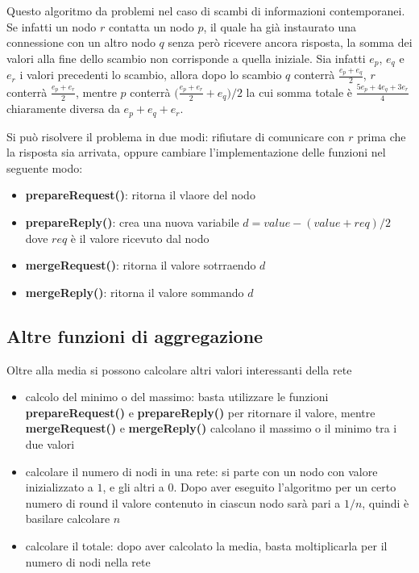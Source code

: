 Questo algoritmo da problemi nel caso di scambi di informazioni contemporanei. Se infatti un nodo $r$ contatta un nodo $p$, il quale ha già instaurato una connessione con un altro nodo $q$ senza però ricevere ancora risposta, la somma dei valori alla fine dello scambio non corrisponde a quella iniziale. Sia infatti $e_p$, $e_q$ e $e_r$ i valori precedenti lo scambio, allora dopo lo scambio $q$ conterrà $\frac{e_p+e_q}{2}$, $r$ conterrà $\frac{e_p + e_r}{2}$, mentre $p$ conterrà $\Big(\frac{e_p+e_r}{2} + e_q\Big) / 2$ la cui somma totale è $\frac{5e_p + 4 e_q + 3e_r}{4}$ chiaramente diversa da $e_p+e_q+e_r$.

Si può risolvere il problema in due modi: rifiutare di comunicare con $r$ prima che la risposta sia arrivata, oppure cambiare l'implementazione delle funzioni nel seguente modo:
\begin{itemize}
    \item \textbf{prepareRequest()}: ritorna il vlaore del nodo
    \item \textbf{prepareReply()}: crea una nuova variabile $d=value - (value + req)/2$ dove $req$ è il valore ricevuto dal nodo
    \item \textbf{mergeRequest()}: ritorna il valore sotrraendo $d$
    \item \textbf{mergeReply()}: ritorna il valore sommando $d$
\end{itemize}


\subsection{Altre funzioni di aggregazione}
Oltre alla media si possono calcolare altri valori interessanti della rete
\begin{itemize}
    \item calcolo del minimo o del massimo: basta utilizzare le funzioni \textbf{prepareRequest()} e \textbf{prepareReply()} per ritornare il valore, mentre \textbf{mergeRequest()} e \textbf{mergeReply()} calcolano il massimo o il minimo tra i due valori
    \item calcolare il numero di nodi in una rete: si parte con un nodo con valore inizializzato a $1$, e gli altri  a $0$. Dopo aver eseguito l'algoritmo per un certo numero di round il valore contenuto in ciascun nodo sarà pari a $1/n$, quindi è basilare calcolare $n$
    \item calcolare il totale: dopo aver calcolato la media, basta moltiplicarla per il numero di nodi nella rete 
\end{itemize}






